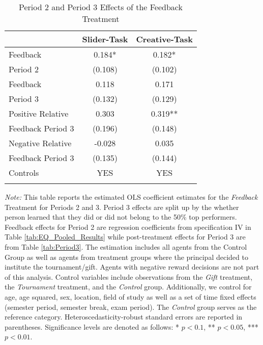 \begin{table}[H]
\caption{Period 2 and Period 3 Effects of the Feedback Treatment}%
\begin{center}%
{\small\renewcommand{\arraystretch}{0.8}%
{\setlength{\tabcolsep}{7pt}
\begin{tabular}{lcc}
\hline\hline\noalign{\smallskip}
    &\textbf{Slider-Task}&\textbf{Creative-Task}\\
\hline\noalign{\smallskip}
Feedback	&	0.184*	&	0.182*  \\
Period 2	&	(0.108)	&	(0.102)	\\\noalign{\smallskip}\hline\noalign{\medskip}
Feedback	&	0.118	&	0.171	\\
Period 3	&	(0.132)	&	(0.129)	\\\noalign{\smallskip}\hline\noalign{\medskip}
Positive Relative	&	0.303	&	0.319**	\\
Feedback Period 3	&	(0.196)	&	(0.148)	\\[2mm]
Negative Relative	&	-0.028	&	0.035	\\
Feedback Period 3	&	(0.135)	&	(0.144)	\\[4mm]
\hline
Controls           &   YES   &       YES   \\
\hline\hline\noalign{\medskip}
\end{tabular}}
\begin{minipage}{0.8\textwidth}
\footnotesize
{\it Note:} This table reports the estimated OLS coefficient estimates for the \textit{Feedback} Treatment for Periods 2 and 3. Period 3 effects are split up by the whether person learned that they did or did not belong to the 50\% top performers. Feedback effects for Period 2 are regression coefficients from  specification IV in Table \ref{tab:EQ_Pooled_Results} while post-treatment effects for Period 3 are from Table \ref{tab:Period3}. 
The estimation includes all agents from the Control Group as well as agents from treatment groups where the principal decided to institute the tournament/gift. Agents with negative reward decisions are not part of this analysis. Control variables include observations from the \textit{Gift} treatment, the \textit{Tournament} treatment, and the \textit{Control} group. Additionally, we control for age, age squared, sex, location, field of study as well as a set of time fixed  effects (semester period, semester break, exam period). The \textit{Control} group serves as the reference category. Heteroscedasticity-robust standard errors are reported in parentheses. Significance levels are denoted as follows: * $p < 0.1$, ** $p < 0.05$, *** $p < 0.01$. 
\end{minipage}}
\end{center}
\label{tab:Feedback}
\end{table}